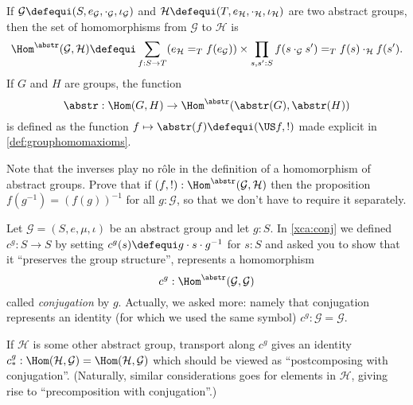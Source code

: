 \begin{definition}\label{def:abstrisfunctor}
  If $\mathcal G\defequi(S,e_{\mathcal G},\cdot_{\mathcal G},\iota_{\mathcal G})$ and $\mathcal H\defequi(T,e_{\mathcal H},\cdot_{\mathcal H},\iota_{\mathcal H})$ are two abstract groups, then the set of homomorphisms from $\mathcal G$ to $\mathcal H$ is
  $$\Hom^\abstr(\mathcal G,\mathcal H)
\defequi\sum_{f:S\to T}(e_{\mathcal H}=_Tf(e_{\mathcal G}))\times
\prod_{s,s':S}f(s\cdot_{\mathcal G}s')=_Tf(s)\cdot_{\mathcal H}f(s').
$$
If $G$ and $H$ are groups, the function
$$\abstr:\Hom(G,H)\to\Hom^\abstr(\abstr(G),\abstr(H))$$
is defined as the function $f\mapsto \abstr(f)\defequi(\US f,!)$
made explicit in \cref{def:grouphomomaxioms}.
\end{definition}
\begin{xca}
  Note that the inverses play no r\^ole in the definition of a homomorphism of abstract groups.  Prove that if $(f,!):\Hom^\abstr(\mathcal G,\mathcal H)$
  then the proposition $f(g^{-1})=(f(g))^{-1}$ for all $g:\mathcal
  G$, so that we don't have to require it separately.
\end{xca}
\begin{example}
  \label{ex:conjhomo}
  Let $\mathcal G=(S,e,\mu,\iota)$ be an abstract group and let $g:S$.  In \cref{xca:conj} we defined $c^g:S\to S$ by setting $c^g(s)\defequi g\cdot s\cdot g^{-1}$ for $s:S$ and asked you to show that it ``preserves the group structure'', \ie represents a homomorphism
$$c^g:\Hom^\abstr(\mathcal G,\mathcal G)$$
called \emph{conjugation} by $g$.
Actually, we asked more: namely that conjugation represents an identity (for which we used the same symbol) $c^g:\mathcal G=\mathcal G$.

If $\mathcal H$ is some other abstract group, transport along $c^g$ gives an identity
 $c^g_*:\Hom(\mathcal H,\mathcal G)=\Hom(\mathcal H,\mathcal G)$ which should be viewed as ``postcomposing with conjugation''.  (Naturally, similar considerations goes for elements in $\mathcal H$, giving rise to ``precomposition with conjugation''.)
\end{example}

